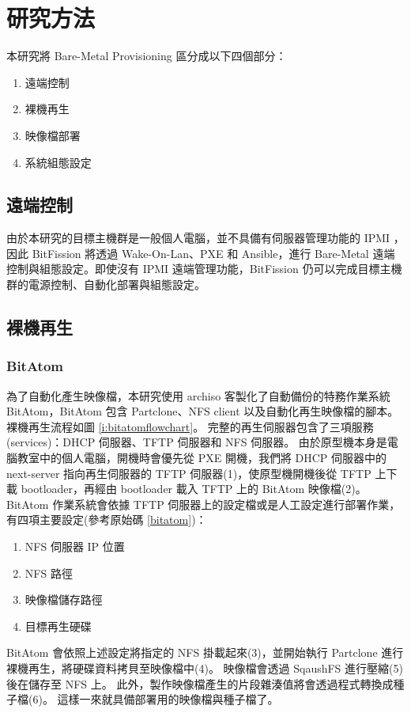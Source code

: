 \chapter{研究方法}

本研究將 Bare-Metal Provisioning 區分成以下四個部分：

\begin{enumerate}
\item 遠端控制
\item 裸機再生
\item 映像檔部署
\item 系統組態設定
\end{enumerate}

\section{遠端控制}
由於本研究的目標主機群是一般個人電腦，並不具備有伺服器管理功能的 IPMI ，因此 BitFission 將透過 Wake-On-Lan、PXE 和 Ansible，進行 Bare-Metal 遠端控制與組態設定。即使沒有 IPMI 遠端管理功能，BitFission 仍可以完成目標主機群的電源控制、自動化部署與組態設定。


\section{裸機再生}
\subsection{BitAtom}


為了自動化產生映像檔，本研究使用 archiso 客製化了自動備份的特務作業系統 BitAtom，BitAtom 包含 Partclone、NFS client 以及自動化再生映像檔的腳本。
裸機再生流程如圖 \ref{i:bitatomflowchart}。
完整的再生伺服器包含了三項服務(services)：DHCP 伺服器、TFTP 伺服器和 NFS 伺服器。
由於原型機本身是電腦教室中的個人電腦，開機時會優先從 PXE 開機，我們將 DHCP 伺服器中的 next-server 指向再生伺服器的 TFTP 伺服器(1)，使原型機開機後從 TFTP 上下載 bootloader，再經由 bootloader 載入 TFTP 上的 BitAtom 映像檔(2)。BitAtom 作業系統會依據 TFTP 伺服器上的設定檔或是人工設定進行部署作業，有四項主要設定(參考原始碼 \ref{bitatom})：
\begin{enumerate}
\item NFS 伺服器 IP 位置
\item NFS 路徑
\item 映像檔儲存路徑
\item 目標再生硬碟
\end{enumerate}
BitAtom 會依照上述設定將指定的 NFS 掛載起來(3)，並開始執行 Partclone 進行裸機再生，將硬碟資料拷貝至映像檔中(4)。
映像檔會透過 SqaushFS 進行壓縮(5)後在儲存至 NFS 上。
此外，製作映像檔產生的片段雜湊值將會透過程式轉換成種子檔(6)。
這樣一來就具備部署用的映像檔與種子檔了。

